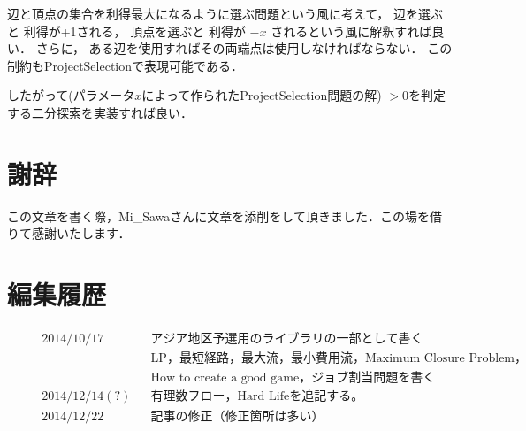 \documentclass[13pt, a4paper, landscape]{jarticle}
\theoremstyle{nonitalic} %
\begin{document}
辺と頂点の集合を利得最大になるように選ぶ問題という風に考えて， 辺を選ぶと 利得が+1される， 頂点を選ぶと 利得が $-x$ されるという風に解釈すれば良い． さらに， ある辺を使用すればその両端点は使用しなければならない． この制約もProjectSelectionで表現可能である． 

したがって(パラメータ$x$によって作られたProjectSelection問題の解) $>0$を判定する二分探索を実装すれば良い． 





\section*{謝辞}
この文章を書く際，Mi\_Sawaさんに文章を添削をして頂きました．この場を借りて感謝いたします．

\section*{編集履歴}
\begin{align*}
  &&& 2014/10/17 && アジア地区予選用のライブラリの一部として書く &&&\\
  &&&            && \mathrm{LP}， 最短経路， 最大流， 最小費用流， \textrm{Maximum Closure Problem}， \\
  &&&            &&\textrm{How to create a good game}， ジョブ割当問題を書く \\
  &&& 2014/12/14(?) && 有理数フロー， \textrm{Hard Life}を追記する。 \\
  &&& 2014/12/22    && 記事の修正（修正箇所は多い）
\end{align*}
\end{document}
